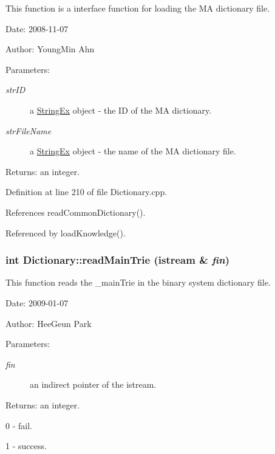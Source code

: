 This function is a interface function for loading the MA dictionary file. 

\begin{Desc}
\item[Date:]2008-11-07 \end{Desc}
\begin{Desc}
\item[Author:]YoungMin Ahn \end{Desc}
\begin{Desc}
\item[Parameters:]
\begin{description}
\item[{\em strID}]a \hyperlink{classStringEx}{StringEx} object - the ID of the MA dictionary. \item[{\em strFileName}]a \hyperlink{classStringEx}{StringEx} object - the name of the MA dictionary file. \end{description}
\end{Desc}
\begin{Desc}
\item[Returns:]an integer. \end{Desc}


Definition at line 210 of file Dictionary.cpp.

References readCommonDictionary().

Referenced by loadKnowledge().\hypertarget{classkmaOrange_1_1Dictionary_72117f9ee66237abee6a4e1cbe607a51}{
\subsubsection[{readMainTrie}]{\setlength{\rightskip}{0pt plus 5cm}int Dictionary::readMainTrie (istream \& {\em fin})}}
\label{classkmaOrange_1_1Dictionary_72117f9ee66237abee6a4e1cbe607a51}


This function reads the \_\-mainTrie in the binary system dictionary file. 

\begin{Desc}
\item[Date:]2009-01-07 \end{Desc}
\begin{Desc}
\item[Author:]HeeGeun Park \end{Desc}
\begin{Desc}
\item[Parameters:]
\begin{description}
\item[{\em fin}]an indirect pointer of the istream. \end{description}
\end{Desc}
\begin{Desc}
\item[Returns:]an integer.\par
 0 - fail.\par
 1 - success. \end{Desc}


